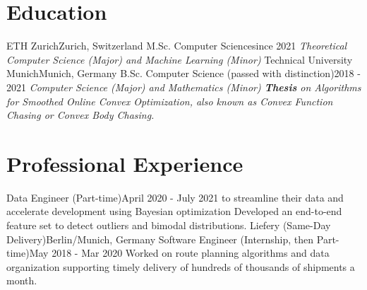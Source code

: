 \documentclass[a4paper,20pt]{article}
\begin{document}


\vspace{-5pt}
\section{Education}
  \resumeSubHeadingListStart
    \resumeSubheading
      {ETH Zurich}{Zurich, Switzerland}
      {M.Sc. Computer Science}{since 2021}
      {\scriptsize \textit{ \footnotesize{\newline{}Theoretical Computer Science (Major) and Machine Learning (Minor)}}}
    \resumeSubHeadingListEnd
\vspace{-5pt}
  \resumeSubHeadingListStart
    \resumeSubheading
      {Technical University Munich}{Munich, Germany}
      {B.Sc. Computer Science (passed with distinction)}{2018 - 2021}
      {\scriptsize \textit{ \footnotesize{\newline{}Computer Science (Major) and Mathematics (Minor)}
      \footnotesize{\newline{}\textbf{Thesis} on Algorithms for Smoothed Online Convex Optimization, also known as Convex Function Chasing or Convex Body Chasing.}}}
    \resumeSubHeadingListEnd

\vspace{-5pt}
\section{Professional Experience}
  \resumeSubHeadingListStart
    {Data Engineer (Part-time)}{April 2020 - July 2021}
    \resumeItemListStart
          {to streamline their data and accelerate development using Bayesian optimization}
          {Developed an end-to-end feature set to detect outliers and bimodal distributions.}
      \resumeItemListEnd
    \resumeSubheading
		{Liefery (Same-Day Delivery)}{Berlin/Munich, Germany}
		{Software Engineer (Internship, then Part-time)}{May 2018 - Mar 2020}
		\resumeItemListStart
          {Worked on route planning algorithms and data organization supporting timely delivery of hundreds of thousands of shipments a month.}
		\resumeItemListEnd
\resumeSubHeadingListEnd
\end{document}
